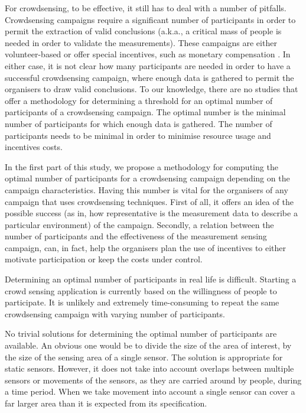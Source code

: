 For crowdsensing, to be effective, it still has to deal with a number of pitfalls. Crowdsensing campaigns require a significant number of participants in order to permit the extraction of valid conclusions (a.k.a., a critical mass of people is needed in order to validate the measurements). These campaigns are either volunteer-based or offer special incentives, such as monetary compensation \cite{ra2012medusa}. In either case, it is not clear how many participants are needed in order to have a successful crowdsensing campaign, where enough data is gathered to permit the organisers to draw valid conclusions. To our knowledge, there are no studies that offer a methodology for determining a threshold for an optimal number of participants of a crowdsensing campaign. The optimal number is the minimal number of participants for which enough data is gathered. The number of participants needs to be minimal in order to minimise resource usage and incentives costs.

In the first part of this study, we propose a methodology for computing the optimal number of participants for a crowdsensing campaign depending on the campaign characteristics. Having this number is vital for the organisers of any campaign that uses crowdsensing techniques. First of all, it offers an idea of the possible success (as in, how representative is the measurement data to describe a particular environment) of the campaign. Secondly, a relation between the number of participants and the effectiveness of the measurement sensing campaign, can, in fact, help the organisers plan the use of incentives to either motivate participation or keep the costs under control.

Determining an optimal number of participants in real life is difficult. Starting a crowd sensing application is currently based on the willingness of people to participate. It is unlikely and extremely time-consuming to repeat the same crowdsensing campaign with varying number of participants.

No trivial solutions for determining the optimal number of participants are available. An obvious one would be to divide the size of the area of interest, by the size of the sensing area of a single sensor. The solution is appropriate for static sensors. However, it does not take into account overlaps between multiple sensors or movements of the sensors, as they are carried around by people, during a time period. When we take movement into account a single sensor can cover a far larger area than it is expected from its specification.

